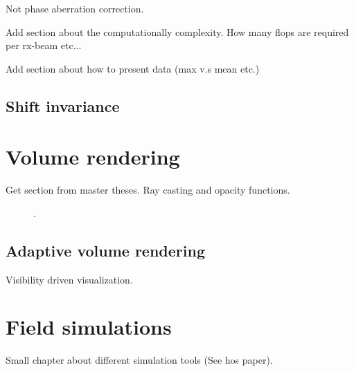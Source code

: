 Not phase aberration correction.

Add section about the computationally complexity. How many flops are required per rx-beam etc...

Add section about how to present data (max v.s mean etc.)
						
\subsection{Shift invariance}

\section{Volume rendering}\label{sec:volren}

Get section from master theses. Ray casting and opacity functions.

\begin{figure}
\centering
{}
\caption{.}
\label{fig:vr}
\end{figure}

\subsection{Adaptive volume rendering}

Visibility driven visualization.

\section{Field simulations}\label{sec:field}

Small chapter about different simulation tools (See hos paper).
			
\endinput
